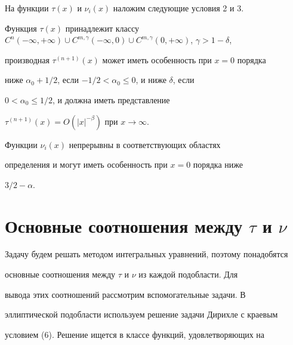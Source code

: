  


На функции $\tau(x)$ и $\nu_i(x)$ наложим следующие условия 2 и 3. 


 


 


\begin{cond} 


Функция $\tau(x)$ принадлежит классу $C^n(-\infty,+\infty)\cup 


C^{m,\gamma}(-\infty,0)\cup C^{m,\gamma}(0,+\infty)$, $\gamma>1-\delta$, 


производная $\tau^{(n+1)}(x)$ может иметь особенность при $x=0$ порядка 


ниже $\alpha_0+1/2$, если $-1/2<\alpha_0\le0$, и ниже $\delta$, если 


$0<\alpha_0\le1/2$, и должна иметь представление 


$\tau^{(n+1)}(x)=O(|x|^{-\beta})$ при $x\to\infty$. 


\end{cond} 


 


 


\begin{cond} 


Функции $\nu_i(x)$ непрерывны в соответствующих областях 


определения и могут иметь особенность при $x=0$ порядка ниже 


$3/2-\alpha$. 


\end{cond} 


 


 


\section{Основные соотношения между $\tau$ и $\nu$} 


 


Задачу будем решать методом интегральных уравнений, поэтому понадобятся 


основные соотношения между $\tau$ и $\nu$ из каждой подобласти. Для 


вывода этих соотношений рассмотрим вспомогательные задачи. В 


эллиптической подобласти используем решение задачи Дирихле с краевым 


условием (6). Решение ищется в классе функций, удовлетворяющих на 



